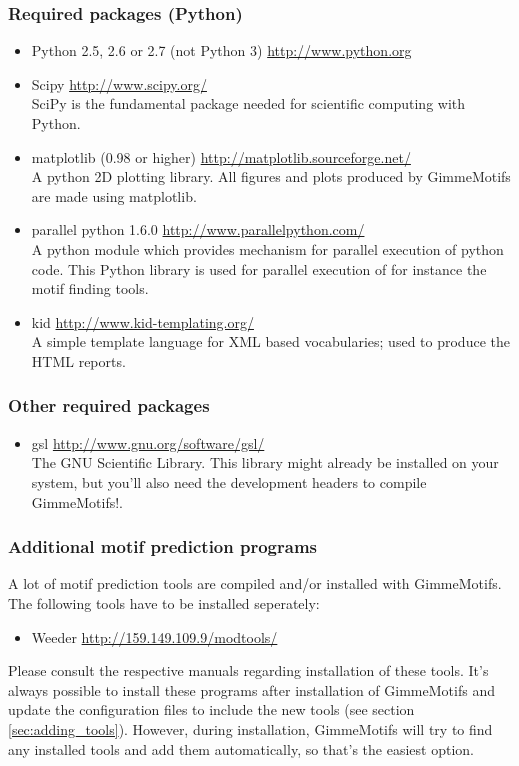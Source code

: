 \documentclass[11pt]{article}
\begin{document}
\subsubsection{Required packages (Python)}
\begin{itemize}
\item Python 2.5, 2.6 or 2.7 (not Python 3) \url{http://www.python.org}
\item Scipy \url{http://www.scipy.org/} \\
SciPy is the fundamental package needed for scientific computing with Python. 
\item matplotlib (0.98 or higher) \url{http://matplotlib.sourceforge.net/} \\
A python 2D plotting library. All figures and plots produced by GimmeMotifs are made using matplotlib.
\item parallel python 1.6.0 \url{http://www.parallelpython.com/} \\
A python module which provides mechanism for parallel execution of python code. This Python library is used for parallel execution of for instance the motif finding tools. 
\item kid \url{http://www.kid-templating.org/} \\
A simple template language for XML based vocabularies; used to produce the HTML reports.
\end{itemize}

\subsubsection{Other required packages}
\begin{itemize}
 \item gsl \url{http://www.gnu.org/software/gsl/} \\
The GNU Scientific Library. 
This library might already be installed on your system, but you'll also need the development headers to compile GimmeMotifs!. 
\end{itemize}

\subsubsection{Additional motif prediction programs}
A lot of motif prediction tools are compiled and/or installed with GimmeMotifs. The following tools have to be installed seperately: 
\begin{itemize}
\item Weeder \cite{pavesi_weeder_2004} \url{http://159.149.109.9/modtools/}
\end{itemize}
Please consult the respective manuals regarding installation of these tools. It's always possible to install these programs after installation of GimmeMotifs and update the configuration files to include the new tools (see section \ref{sec:adding_tools}). However, during installation, GimmeMotifs will try to find any installed tools and add them automatically, so that's the easiest option.
\end{document}
